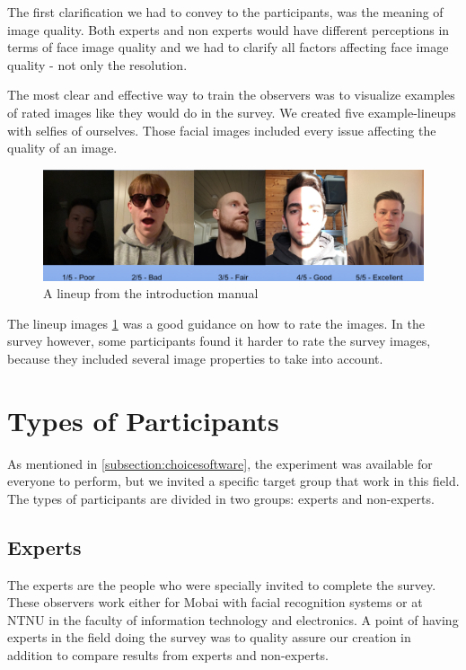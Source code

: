 The first clarification we had to convey to the participants, was the meaning of image quality. Both experts and non experts would have different perceptions in terms of face image quality and we had to clarify all factors affecting face image quality - not only the resolution. 

The most clear and effective way to train the observers was to visualize examples of rated images like they would do in the survey. We created five example-lineups with selfies of ourselves. Those facial images included every issue affecting the quality of an image. 

\begin{figure}[h]
    \centering
    \includegraphics[scale = 0.23]{figures/Example-lineup.png}
    \caption{A lineup from the introduction manual}
    \label{fig:example-manual}
\end{figure}

The lineup images \ref{fig:example-manual} was a good guidance on how to rate the images. In the survey however, some participants found it harder to rate the survey images, because they included several image properties to take into account. 

\section{Types of Participants}
As mentioned in \ref{subsection:choicesoftware}, the experiment was available for everyone to perform, but we invited a specific target group that work in this field. The types of participants are divided in two groups: experts and non-experts.

\subsection*{Experts}
The experts are the people who were specially invited to complete the survey. These observers work either for Mobai with facial recognition systems or at NTNU in the faculty of information technology and electronics. A point of having experts in the field doing the survey was to quality assure our creation in addition to compare results from experts and non-experts. 


